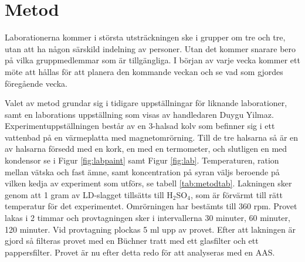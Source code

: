 \section{Metod}

Laborationerna kommer i största utsträckningen ske i grupper om tre och tre, utan att ha någon särskild indelning av personer. Utan det kommer snarare bero på vilka gruppmedlemmar som är tillgängliga. I början av varje vecka kommer ett möte att hållas för att planera den kommande veckan och se vad som gjordes föregående vecka. 

Valet av metod grundar sig i tidigare uppställningar för liknande laborationer, samt en laborations uppställning som visas av handledaren Duygu Yilmaz\cite{Aarabi-Karasgani2010}. Experimentuppställningen består av en 3-halsad kolv som befinner sig i ett vattenbad på en värmeplatta med magnetomrörning. Till de tre halsarna så är en av halsarna försedd med en kork, en med en termometer, och slutligen en med kondensor se i Figur \ref{fig:labpaint} samt Figur \ref{fig:lab}. Temperaturen, ration mellan vätska och fast ämne, samt koncentration på syran väljs beroende på vilken kedja av experiment som utförs, se tabell \ref{tab:metodtab}. Lakningen sker genom att 1 gram av LD-slagget tillsätts till H$_{2}$SO$_{4}$, som är förvärmt till rätt temperatur för det experimentet. Omrörningen har bestämts till 360 rpm. Provet lakas i 2 timmar och provtagningen sker i intervallerna 30 minuter, 60 minuter, 120 minuter. Vid provtagning plockas 5 ml upp av provet. Efter att lakningen är gjord så filteras provet med en Büchner tratt med ett glasfilter och ett pappersfilter. Provet är nu efter detta redo för att analyseras med en AAS. 

